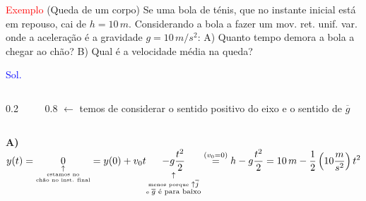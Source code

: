 \documentclass{beamer}
\begin{document}
	
	\begin{frame}{}
		\scriptsize
		\textcolor{red}{\large Exemplo} (Queda de um corpo)  Se uma bola de ténis, que no instante inicial está em repouso, cai de $h = 10\,m$. Considerando a bola a fazer um mov. ret. unif. var. onde a aceleração é a gravidade $g = 10\,m/s^2$: A) Quanto tempo demora a bola a chegar ao chão? B) Qual é a velocidade média na queda?
		
		\vspace{0.1cm}
		\textcolor{blue}{Sol.}
		\begin{columns}[c]
			\begin{column}{0.2\textwidth}
				\begin{center}
				\end{center}
			\end{column}
			\begin{column}{0.8\textwidth}
				$\leftarrow$ temos de considerar o sentido positivo do eixo e o sentido de $\overline{g}$
			\end{column}
		\end{columns}
		

		\textbf{A)}  $\displaystyle y(t) = \underset{\substack{\uparrow \\ \text{\tiny estamos no} \\ \text{\tiny chão no inst. final}}}{0} = y(0) + v_0 t \underset{\substack{\uparrow \\ \text{\tiny menos porque } \uparrow \overline{j} \\ \text{\tiny e } \overline{g} \text{ é para baixo}}}{- g \frac{t^2}{2}} \overset{(v_0=0)}{=} h - g \frac{t^2}{2} = 10\,m - \frac{1}{2}\left(10\frac{m}{s^2}\right)t^2$
		

\end{frame}
\end{document}
